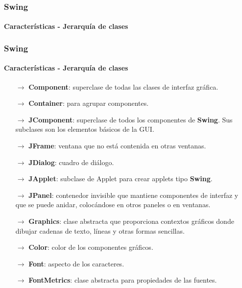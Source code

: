 \documentclass{beamer}
\begin{document}
    \begin{frame}
		\frametitle{Swing}
		\framesubtitle{Caracter\'isticas - Jerarqu\'ia de clases}
		\begin{center}
		\end{center}
	\end{frame}

	\begin{frame}
		\frametitle{Swing}
		\framesubtitle{Caracter\'isticas - Jerarqu\'ia de clases}

		{\scriptsize
		\begin{itemize}
		    \item[$\rightarrow$] \textbf{Component}: superclase de todas las clases de interfaz gr\'afica.
		    \item[$\rightarrow$] \textbf{Container}: para agrupar componentes.
            \item[$\rightarrow$] \textbf{JComponent}: superclase de todos los componentes de \textbf{Swing}. Sus subclases son los elementos b\'asicos de la GUI.
            \item[$\rightarrow$] \textbf{JFrame}: ventana que no est\'a contenida en otras ventanas.
            \item[$\rightarrow$] \textbf{JDialog}: cuadro de di\'alogo.
            \item[$\rightarrow$] \textbf{JApplet}: subclase de Applet para crear applets tipo \textbf{Swing}.
            \item[$\rightarrow$] \textbf{JPanel}: contenedor invisible que mantiene componentes de interfaz y que se puede anidar, coloc\'andose en otros paneles o en ventanas.
            \item[$\rightarrow$] \textbf{Graphics}: clase abstracta que proporciona contextos gr\'aficos donde dibujar cadenas de texto, l\'ineas y otras formas sencillas.
            \item[$\rightarrow$] \textbf{Color}: color de los componentes gr\'aficos.
            \item[$\rightarrow$] \textbf{Font}: aspecto de los caracteres.
            \item[$\rightarrow$] \textbf{FontMetrics}: clase abstracta para propiedades de las fuentes.
		\end{itemize}}
	\end{frame}
\end{document}
